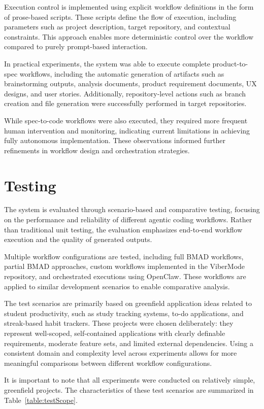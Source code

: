 \documentclass[a4paper,12pt]{report}
\begin{document}
Execution control is implemented using explicit workflow definitions in the form of prose-based scripts. These scripts define the flow of execution, including parameters such as project description, target repository, and contextual constraints. This approach enables more deterministic control over the workflow compared to purely prompt-based interaction.

In practical experiments, the system was able to execute complete product-to-spec workflows, including the automatic generation of artifacts such as brainstorming outputs, analysis documents, product requirement documents, UX designs, and user stories. Additionally, repository-level actions such as branch creation and file generation were successfully performed in target repositories.

While spec-to-code workflows were also executed, they required more frequent human intervention and monitoring, indicating current limitations in achieving fully autonomous implementation. These observations informed further refinements in workflow design and orchestration strategies.
\section{Testing}
The system is evaluated through scenario-based and comparative testing, focusing on the performance and reliability of different agentic coding workflows. Rather than traditional unit testing, the evaluation emphasizes end-to-end workflow execution and the quality of generated outputs.

Multiple workflow configurations are tested, including full BMAD workflows, partial BMAD approaches, custom workflows implemented in the ViberMode repository, and orchestrated executions using OpenClaw. These workflows are applied to similar development scenarios to enable comparative analysis.

The test scenarios are primarily based on greenfield application ideas related to student productivity, such as study tracking systems, to-do applications, and streak-based habit trackers. These projects were chosen deliberately: they represent well-scoped, self-contained applications with clearly definable requirements, moderate feature sets, and limited external dependencies. Using a consistent domain and complexity level across experiments allows for more meaningful comparisons between different workflow configurations.

It is important to note that all experiments were conducted on relatively simple, greenfield projects. The characteristics of these test scenarios are summarized in Table~\ref{table:testScope}.
\end{document}
